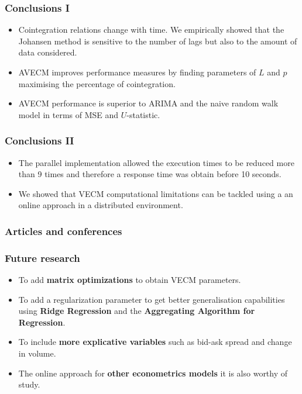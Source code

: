 \documentclass{beamer}
\begin{document}
\begin{frame}
\frametitle{Conclusions I}
\begin{itemize}
\item Cointegration relations change with time. We empirically showed that the Johansen method is sensitive to the number of lags but also to the amount of data considered.
\item AVECM improves performance measures by finding parameters of $L$ and $p$ maximising the percentage of cointegration.
\item AVECM performance is superior to ARIMA and the naive random walk model in terms of MSE and $U$-statistic. 
\end{itemize}
\end{frame}

\begin{frame}
\frametitle{Conclusions II}
\begin{itemize}
\item The parallel implementation allowed the execution times to be reduced
more than 9 times and therefore a response time was obtain before 10
seconds.
\item We showed that VECM computational limitations can be tackled using a an online approach in a distributed environment.
\end{itemize}
\end{frame}


\begin{frame}
\frametitle{Articles and conferences}
\nocite{arce+salinas2012,icpram15,Arce2017}


\end{frame}


\begin{frame}
\frametitle{Future research}
\begin{itemize}
\item To add {\bf matrix optimizations} to obtain VECM parameters.
\item To add a regularization parameter to get better generalisation capabilities using {\bf Ridge Regression} and the {\bf Aggregating Algorithm for Regression}.
\item To include {\bf more explicative variables} such as bid-ask spread and change in volume.
\item The online approach for {\bf other econometrics models} it is also worthy of  study.%
\end{itemize}
\end{frame}
\end{document}
